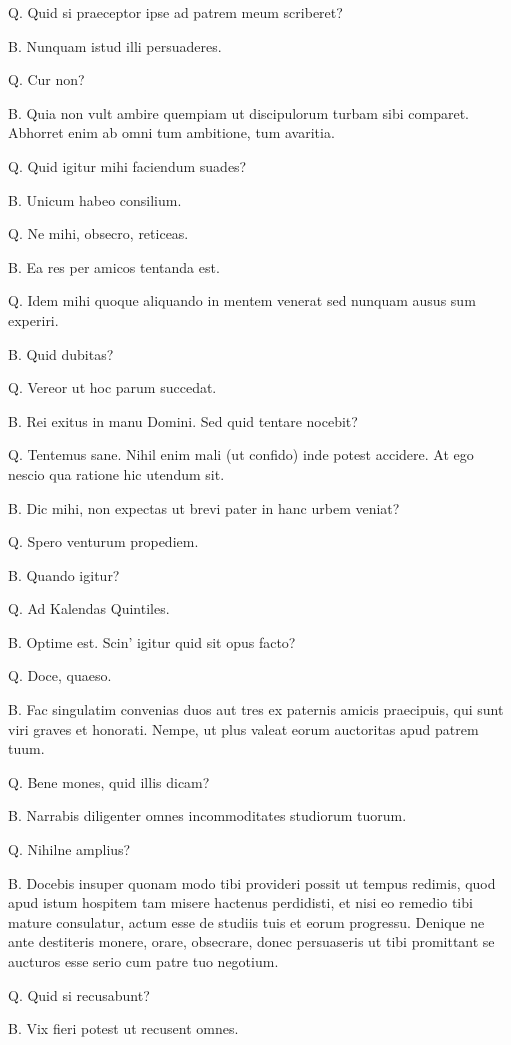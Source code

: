 \documentclass{article}
\begin{document}
Q. Quid si praeceptor ipse ad patrem meum scriberet?

B. Nunquam istud illi persuaderes.

Q. Cur non?

B. Quia non vult ambire quempiam ut discipulorum turbam sibi comparet. Abhorret enim ab omni tum ambitione, tum avaritia.

Q. Quid igitur mihi faciendum suades?

B. Unicum habeo consilium.

Q. Ne mihi, obsecro, reticeas.

B. Ea res per amicos tentanda est.

Q. Idem mihi quoque aliquando in mentem venerat sed nunquam ausus sum experiri.

B. Quid dubitas?

Q. Vereor ut hoc parum succedat.

B. Rei exitus in manu Domini. Sed quid tentare nocebit?

Q. Tentemus sane. Nihil enim mali (ut confido) inde potest accidere. At ego nescio qua ratione hic utendum sit.

B. Dic mihi, non expectas ut brevi pater in hanc urbem veniat?

Q. Spero venturum propediem.

B. Quando igitur?

Q. Ad Kalendas Quintiles.

B. Optime est. Scin' igitur quid sit opus facto?

Q. Doce, quaeso.

B. Fac singulatim convenias duos aut tres ex paternis amicis praecipuis, qui sunt viri graves et honorati. Nempe, ut plus valeat eorum auctoritas apud patrem tuum.

Q. Bene mones, quid illis dicam?

B. Narrabis diligenter omnes incommoditates studiorum tuorum.

Q. Nihilne amplius?

B. Docebis insuper quonam modo tibi provideri possit ut tempus redimis, quod apud istum hospitem tam misere hactenus perdidisti, et nisi eo remedio tibi mature consulatur, actum esse de studiis tuis et eorum progressu. Denique ne ante destiteris monere, orare, obsecrare, donec persuaseris ut tibi promittant se aucturos esse serio cum patre tuo negotium.

Q. Quid si recusabunt?

B. Vix fieri potest ut recusent omnes.
\end{document}
